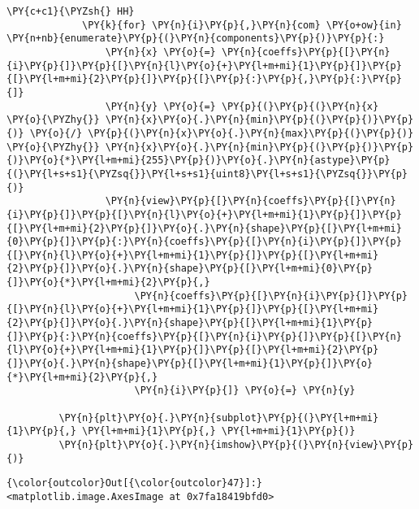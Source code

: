 \begin{Verbatim}[commandchars=\\\{\}]
             \PY{c+c1}{\PYZsh{} HH}
             \PY{k}{for} \PY{n}{i}\PY{p}{,}\PY{n}{com} \PY{o+ow}{in} \PY{n+nb}{enumerate}\PY{p}{(}\PY{n}{components}\PY{p}{)}\PY{p}{:}
                 \PY{n}{x} \PY{o}{=} \PY{n}{coeffs}\PY{p}{[}\PY{n}{i}\PY{p}{]}\PY{p}{[}\PY{n}{l}\PY{o}{+}\PY{l+m+mi}{1}\PY{p}{]}\PY{p}{[}\PY{l+m+mi}{2}\PY{p}{]}\PY{p}{[}\PY{p}{:}\PY{p}{,}\PY{p}{:}\PY{p}{]}
                 \PY{n}{y} \PY{o}{=} \PY{p}{(}\PY{p}{(}\PY{n}{x} \PY{o}{\PYZhy{}} \PY{n}{x}\PY{o}{.}\PY{n}{min}\PY{p}{(}\PY{p}{)}\PY{p}{)} \PY{o}{/} \PY{p}{(}\PY{n}{x}\PY{o}{.}\PY{n}{max}\PY{p}{(}\PY{p}{)} \PY{o}{\PYZhy{}} \PY{n}{x}\PY{o}{.}\PY{n}{min}\PY{p}{(}\PY{p}{)}\PY{p}{)}\PY{o}{*}\PY{l+m+mi}{255}\PY{p}{)}\PY{o}{.}\PY{n}{astype}\PY{p}{(}\PY{l+s+s1}{\PYZsq{}}\PY{l+s+s1}{uint8}\PY{l+s+s1}{\PYZsq{}}\PY{p}{)}
                 \PY{n}{view}\PY{p}{[}\PY{n}{coeffs}\PY{p}{[}\PY{n}{i}\PY{p}{]}\PY{p}{[}\PY{n}{l}\PY{o}{+}\PY{l+m+mi}{1}\PY{p}{]}\PY{p}{[}\PY{l+m+mi}{2}\PY{p}{]}\PY{o}{.}\PY{n}{shape}\PY{p}{[}\PY{l+m+mi}{0}\PY{p}{]}\PY{p}{:}\PY{n}{coeffs}\PY{p}{[}\PY{n}{i}\PY{p}{]}\PY{p}{[}\PY{n}{l}\PY{o}{+}\PY{l+m+mi}{1}\PY{p}{]}\PY{p}{[}\PY{l+m+mi}{2}\PY{p}{]}\PY{o}{.}\PY{n}{shape}\PY{p}{[}\PY{l+m+mi}{0}\PY{p}{]}\PY{o}{*}\PY{l+m+mi}{2}\PY{p}{,}
                      \PY{n}{coeffs}\PY{p}{[}\PY{n}{i}\PY{p}{]}\PY{p}{[}\PY{n}{l}\PY{o}{+}\PY{l+m+mi}{1}\PY{p}{]}\PY{p}{[}\PY{l+m+mi}{2}\PY{p}{]}\PY{o}{.}\PY{n}{shape}\PY{p}{[}\PY{l+m+mi}{1}\PY{p}{]}\PY{p}{:}\PY{n}{coeffs}\PY{p}{[}\PY{n}{i}\PY{p}{]}\PY{p}{[}\PY{n}{l}\PY{o}{+}\PY{l+m+mi}{1}\PY{p}{]}\PY{p}{[}\PY{l+m+mi}{2}\PY{p}{]}\PY{o}{.}\PY{n}{shape}\PY{p}{[}\PY{l+m+mi}{1}\PY{p}{]}\PY{o}{*}\PY{l+m+mi}{2}\PY{p}{,}
                      \PY{n}{i}\PY{p}{]} \PY{o}{=} \PY{n}{y}
         
         \PY{n}{plt}\PY{o}{.}\PY{n}{subplot}\PY{p}{(}\PY{l+m+mi}{1}\PY{p}{,} \PY{l+m+mi}{1}\PY{p}{,} \PY{l+m+mi}{1}\PY{p}{)}
         \PY{n}{plt}\PY{o}{.}\PY{n}{imshow}\PY{p}{(}\PY{n}{view}\PY{p}{)}
\end{Verbatim}


\begin{Verbatim}[commandchars=\\\{\}]
{\color{outcolor}Out[{\color{outcolor}47}]:} <matplotlib.image.AxesImage at 0x7fa18419bfd0>
\end{Verbatim}
            
    \begin{center}
    \end{center}
    { \hspace*{\fill} \\}
    
